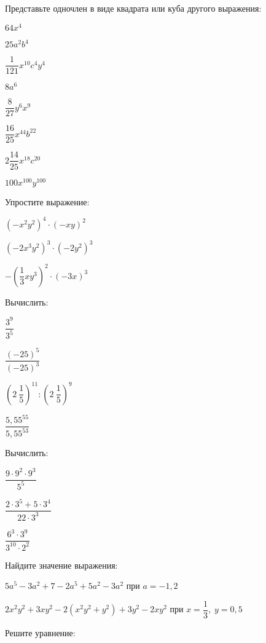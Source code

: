 \begin{listofex}
	\item Представьте одночлен в виде квадрата или куба другого выражения:
	\begin{enumcols}[itemcolumns=4]
		\item \( 64x^4 \)
		\item \( 25a^2b^4 \)
		\item \( \dfrac{1}{121}x^{10}c^4y^{4} \)
		\item \( 8a^6 \)
		\item \( \dfrac{8}{27}y^{6}x^9 \)
		\item \( \dfrac{16}{25}x^{44}b^{22} \)
		\item \( 2\dfrac{14}{25}x^{18}c^{20} \)
		\item \( 100x^{100}y^{100} \)
	\end{enumcols}
	\item Упростите выражение:
	\begin{enumcols}[itemcolumns=3]
		\item \( (-x^2y^2)^4\cdot(-xy)^2 \)
		\item \( (-2x^3y^2)^3\cdot(-2y^2)^3 \)
		\item \( -\left( \dfrac{1}{3}xy^3 \right)^2\cdot(-3x)^3 \)
	\end{enumcols}
	\item Вычислить:
	\begin{enumcols}[itemcolumns=4]
		\item \( \dfrac{3^9}{3^5} \)
		\item \( \dfrac{(-25)^5}{(-25)^3} \)
		\item \( \left( 2\:\dfrac{1}{5} \right)^{11}:\left( 2\:\dfrac{1}{5} \right)^9 \)
		\item \( \dfrac{5,55^{55}}{5,55^{53}} \)
	\end{enumcols}
	\item Вычислить:
	\begin{enumcols}[itemcolumns=3]
		\item \( \dfrac{9\cdot9^2\cdot9^3}{5^{5}} \)
		\item \( \dfrac{2\cdot3^5+5\cdot3^4}{22\cdot3^3} \)
		\item \( \dfrac{6^3\cdot3^9}{3^{10}\cdot2^2} \)
	\end{enumcols}
	\item Найдите значение выражения:
	\begin{enumcols}[itemcolumns=1]
		\item \( 5a^5-3a^2+7-2a^5+5a^2-3a^2 \) при \( a=-1,2 \)
		\item \( 2x^2y^2 + 3xy^2 -2(x^2y^2+y^2) + 3y^2 - 2xy^2\) при \( x=\dfrac{1}{3},\;y=0,5 \)
	\end{enumcols}
	\item Решите уравнение:
	\begin{enumcols}[itemcolumns=3]
		\item {}
		\item {}
		\item {}
		\item {}
		\item {}
	\end{enumcols}
\end{listofex}
%
%
